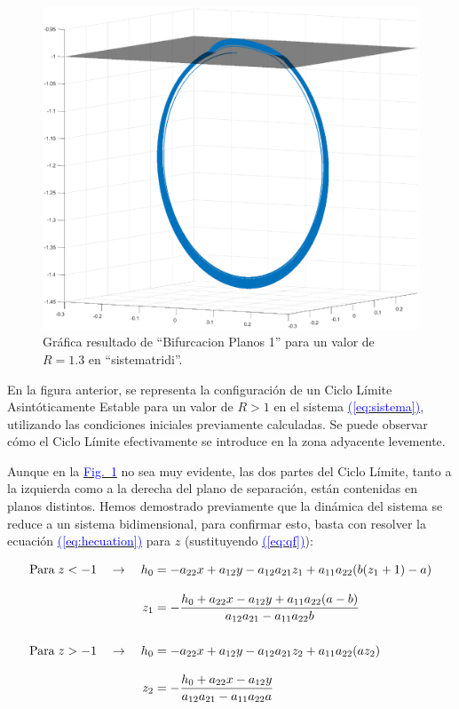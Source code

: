 \documentclass[12pt,a4paper]{report} %
\newcommand{\fref}[1]{\hyperref[#1]{\textcolor{blue}{Fig.~\ref*{#1}}}}
\newcommand{\eref}[1]{\hyperref[#1]{\textcolor{blue}{(\ref*{#1})}}}
\newcommand{\fref}[1]{\hyperref[#1]{\textcolor{blue}{\textit{Fig.~\ref*{#1}}}}}
\newcommand{\eref}[1]{\hyperref[#1]{\textcolor{blue}{\textit{(\ref*{#1})}}}}
\begin{document}
	\begin{figure}[h]
		\centering
		\includegraphics[width=1\textwidth]{ciclocir.eps}
		\caption{Gráfica resultado de ``Bifurcacion Planos 1'' para un valor de $R=1.3$ en ``sistematridi''.}
		\label{fig:ciclocircuito}
	\end{figure}\smallskip
	
		\vspace{0.5cm}\noindent En la figura anterior, se representa la configuración de un Ciclo Límite Asintóticamente Estable para un valor de $R>1$ en el sistema \eref{eq:sistema}, utilizando las condiciones iniciales previamente calculadas. Se puede observar cómo el Ciclo Límite efectivamente se introduce en la zona adyacente levemente.
		
		\newpage
		
	Aunque en la \fref{fig:ciclocircuito} no sea muy evidente, las dos partes del Ciclo Límite, tanto a la izquierda como a la derecha del plano de separación, están contenidas en planos distintos. Hemos demostrado previamente que la dinámica del sistema se reduce a un sistema bidimensional, para confirmar esto, basta con resolver la ecuación \eref{eq:hecuation} para $z$ (sustituyendo \eref{eq:qf}):
		
		\begin{subequations}
			\label{eq:funcz}
			\begin{align}
				\text{Para}\; z<-1 \quad \rightarrow \quad h_0&=-a_{22}x+a_{12}y-a_{12}a_{21}z_1+a_{11}a_{22}(b(z_1+1)-a)\notag\\[3mm]
				z_1&=-\frac{h_0+a_{22}x-a_{12}y+a_{11}a_{22}(a-b)}{a_{12}a_{21}-a_{11}a_{22}b} \label{eq:z1} \\[5mm]
				\text{Para}\; z>-1 \quad \rightarrow \quad h_0&=-a_{22}x+a_{12}y-a_{12}a_{21}z_2+a_{11}a_{22}(az_2)\notag\\[3mm]
				z_2&=-\frac{h_0+a_{22}x-a_{12}y}{a_{12}a_{21}-a_{11}a_{22}a} \label{eq:z2}
			\end{align}
		\end{subequations}
		
\end{document}
